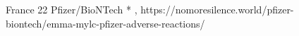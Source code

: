           {France}
          {22}
          {Pfizer/BioNTech}
          {*}
          {
            ,
          }
          {https://nomoresilence.world/pfizer-biontech/emma-mylc-pfizer-adverse-reactions/}

